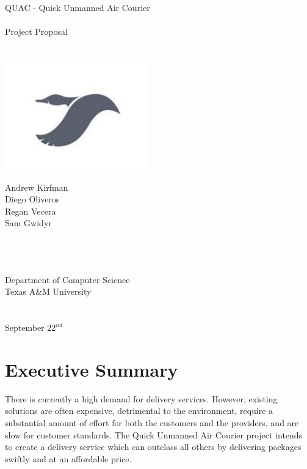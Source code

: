 \documentclass[12pt]{extarticle}
\begin{document}
\vspace*{15mm}
\begin{center}
{\huge
QUAC - Quick Unmanned Air Courier\\[.5ex]}
\ \\
{\LARGE 
Project Proposal\\}
\ \\
\ \\
\includegraphics[scale=0.8]{logo.png}

{\LARGE
Andrew Kirfman\\[.5ex]
Diego Oliveros\\[.5ex]
Regan Vecera\\[.5ex]
Sam Gwidyr\\[.5ex]}

\ \\
\ \\
\ \\

{\LARGE 
Department of Computer Science \\
Texas A\&M University \\
\ \\
\ \\
September $22^{nd}$}
\end{center}
\newpage
{}

\setcounter{tocdepth}{3}
\tableofcontents

\newpage
\section{Executive Summary}

There is currently a high demand for delivery services. However, existing solutions are often expensive, detrimental to the environment, require a substantial amount of effort for both the customers and the providers, and are slow for customer standards. The Quick Unmanned Air Courier project intends to create a delivery service which can outclass all others by delivering packages swiftly and at an affordable price.
\end{document}
